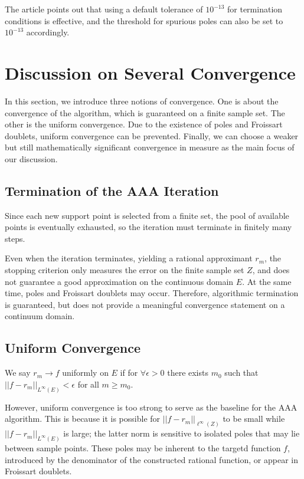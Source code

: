 \documentclass[12pt,a4paper]{article}  %
\newcounter{cite}
\theoremstyle{definition}
\numberwithin{equation}{section}
\begin{document}
The article \cite{Nakatsukasa_2018} points out that using a default tolerance of $10^{-13}$ for termination conditions is effective, and the threshold for spurious poles can also be set to $10^{-13}$ accordingly.

\section{Discussion on Several Convergence}
In this section, we introduce three notions of convergence. One is about the convergence of the algorithm, which is guaranteed on a finite sample set. The other is the uniform convergence. Due to the existence of poles and Froissart doublets, uniform convergence can be prevented. Finally, we can choose a
weaker but still mathematically significant convergence in measure as the main focus of our discussion.

\subsection{Termination of the AAA Iteration}
Since each new support point is selected from a finite set, the pool of available points is eventually exhausted, so the iteration must terminate in finitely many steps.

Even when the iteration terminates, yielding a rational approximant $r_m$, the stopping criterion only measures the error on the finite sample set $Z$, and does not guarantee a good approximation on the continuous domain $E$. At the same time, poles and Froissart doublets may occur. Therefore, algorithmic termination is guaranteed, but does not provide a meaningful convergence statement on a continuum domain. 

\subsection{Uniform Convergence}
We say $r_m\to f$ uniformly on $E$ if for $\forall\epsilon>0$ there exists $m_0$ such that $||f-r_m||_{L^\infty(E)}<\epsilon$ for all $m\ge m_0$.

However, uniform convergence is too strong to serve as the baseline for the AAA algorithm. This is because it is possible for $||f-r_m||_{\ell^\infty(Z)}$ to be small while $||f-r_m||_{L^\infty(E)}$ is large; the latter norm is sensitive to isolated poles that may lie between sample points. These poles may be inherent to the targetd function $f$, introduced by the denominator of the constructed rational function, or appear in Froissart doublets.
\end{document}

